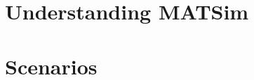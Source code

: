 \cleardoublepage

 \cleardoublepage
 \cleardoublepage

\part{Understanding MATSim} \cleardoublepage
\label{part:understanding-matsim}
 \cleardoublepage

\part{Scenarios} \cleardoublepage
\label{part:scenarios}

